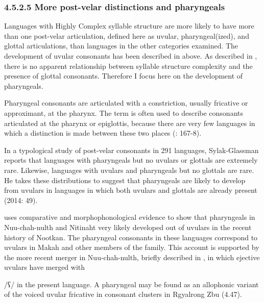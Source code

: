\subsubsection{\textbf{4.5.2.5} \textbf{More} \textbf{post-velar} \textbf{distinctions} \textbf{and} \textbf{pharyngeals}}

  Languages with Highly Complex syllable structure are more likely to have more than one post-velar articulation, defined here as uvular, pharyngeal(ized), and glottal articulations, than languages in the other categories examined. The development of uvular consonants has been described in  above. As described in , there is no apparent relationship between syllable structure complexity and the presence of glottal consonants. Therefore I focus here on the development of pharyngeals.



  Pharyngeal consonants are articulated with a constriction, usually fricative or approximant, at the pharynx. The term is often used to describe consonants articulated at the pharynx or epiglottis, because there are very few languages in which a distinction is made between these two places (\citealt{LadefogedMaddieson1996}: 167-8).



  In a typological study of post-velar consonants in 291 languages, Sylak-Glassman reports that languages with pharyngeals but no uvulars or glottals are extremely rare. Likewise, languages with uvulars and pharyngeals but no glottals are rare. He takes these distributions to suggest that pharyngeals are likely to develop from uvulars in languages in which both uvulars and glottals are already present (2014: 49).



  \citet{Jacobsen1969} uses comparative and morphophonological evidence to show that pharyngeals in Nuu-chah-nulth and Nitinaht very likely developed out of uvulars in the recent history of Nootkan. The pharyngeal consonants in these languages correspond to uvulars in Makah and other members of the family. This account is supported by the more recent merger in Nuu-chah-nulth, briefly described in , in which ejective uvulars have merged with 



/ʕ/ in the present language. A pharyngeal may be found as an allophonic variant of the voiced uvular fricative in consonant clusters in Rgyalrong Zbu (4.47).



